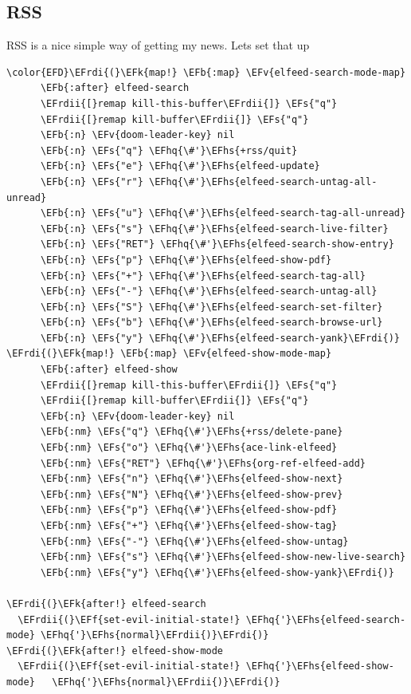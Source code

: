 \documentclass{scrartcl}
\newcommand{\EFk}[1]{\textcolor{EFk}{#1}} %
\newcommand{\EFs}[1]{\textcolor{EFs}{#1}} %
\newcommand{\EFb}[1]{\textcolor{EFb}{#1}} %
\newcommand{\EFv}[1]{\textcolor{EFv}{#1}} %
\newcommand{\EFf}[1]{\textcolor{EFf}{#1}} %
\newcommand{\EFhq}[1]{\textcolor{EFhq}{#1}} %
\newcommand{\EFhs}[1]{\textcolor{EFhs}{#1}} %
\newcommand{\EFrdi}[1]{\textcolor{EFrdi}{#1}} %
\newcommand{\EFrdii}[1]{\textcolor{EFrdii}{#1}} %
\begin{document}
\subsection{RSS}
\label{sec:orgfb8611c}
RSS is a nice simple way of getting my news. Lets set that up
\begin{Code}
\begin{Verbatim}[]
\color{EFD}\EFrdi{(}\EFk{map!} \EFb{:map} \EFv{elfeed-search-mode-map}
      \EFb{:after} elfeed-search
      \EFrdii{[}remap kill-this-buffer\EFrdii{]} \EFs{"q"}
      \EFrdii{[}remap kill-buffer\EFrdii{]} \EFs{"q"}
      \EFb{:n} \EFv{doom-leader-key} nil
      \EFb{:n} \EFs{"q"} \EFhq{\#'}\EFhs{+rss/quit}
      \EFb{:n} \EFs{"e"} \EFhq{\#'}\EFhs{elfeed-update}
      \EFb{:n} \EFs{"r"} \EFhq{\#'}\EFhs{elfeed-search-untag-all-unread}
      \EFb{:n} \EFs{"u"} \EFhq{\#'}\EFhs{elfeed-search-tag-all-unread}
      \EFb{:n} \EFs{"s"} \EFhq{\#'}\EFhs{elfeed-search-live-filter}
      \EFb{:n} \EFs{"RET"} \EFhq{\#'}\EFhs{elfeed-search-show-entry}
      \EFb{:n} \EFs{"p"} \EFhq{\#'}\EFhs{elfeed-show-pdf}
      \EFb{:n} \EFs{"+"} \EFhq{\#'}\EFhs{elfeed-search-tag-all}
      \EFb{:n} \EFs{"-"} \EFhq{\#'}\EFhs{elfeed-search-untag-all}
      \EFb{:n} \EFs{"S"} \EFhq{\#'}\EFhs{elfeed-search-set-filter}
      \EFb{:n} \EFs{"b"} \EFhq{\#'}\EFhs{elfeed-search-browse-url}
      \EFb{:n} \EFs{"y"} \EFhq{\#'}\EFhs{elfeed-search-yank}\EFrdi{)}
\EFrdi{(}\EFk{map!} \EFb{:map} \EFv{elfeed-show-mode-map}
      \EFb{:after} elfeed-show
      \EFrdii{[}remap kill-this-buffer\EFrdii{]} \EFs{"q"}
      \EFrdii{[}remap kill-buffer\EFrdii{]} \EFs{"q"}
      \EFb{:n} \EFv{doom-leader-key} nil
      \EFb{:nm} \EFs{"q"} \EFhq{\#'}\EFhs{+rss/delete-pane}
      \EFb{:nm} \EFs{"o"} \EFhq{\#'}\EFhs{ace-link-elfeed}
      \EFb{:nm} \EFs{"RET"} \EFhq{\#'}\EFhs{org-ref-elfeed-add}
      \EFb{:nm} \EFs{"n"} \EFhq{\#'}\EFhs{elfeed-show-next}
      \EFb{:nm} \EFs{"N"} \EFhq{\#'}\EFhs{elfeed-show-prev}
      \EFb{:nm} \EFs{"p"} \EFhq{\#'}\EFhs{elfeed-show-pdf}
      \EFb{:nm} \EFs{"+"} \EFhq{\#'}\EFhs{elfeed-show-tag}
      \EFb{:nm} \EFs{"-"} \EFhq{\#'}\EFhs{elfeed-show-untag}
      \EFb{:nm} \EFs{"s"} \EFhq{\#'}\EFhs{elfeed-show-new-live-search}
      \EFb{:nm} \EFs{"y"} \EFhq{\#'}\EFhs{elfeed-show-yank}\EFrdi{)}

\EFrdi{(}\EFk{after!} elfeed-search
  \EFrdii{(}\EFf{set-evil-initial-state!} \EFhq{'}\EFhs{elfeed-search-mode} \EFhq{'}\EFhs{normal}\EFrdii{)}\EFrdi{)}
\EFrdi{(}\EFk{after!} elfeed-show-mode
  \EFrdii{(}\EFf{set-evil-initial-state!} \EFhq{'}\EFhs{elfeed-show-mode}   \EFhq{'}\EFhs{normal}\EFrdii{)}\EFrdi{)}


\end{Verbatim}
\end{Code}
\end{document}
